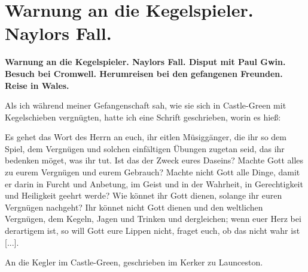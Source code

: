 
\chapter[Warnung an die Kegelspieler. Naylors Fall.]{Warnung an die Kegelspieler. Naylors Fall.}

\begin{center}
\textbf{Warnung an die Kegelspieler. Naylors Fall. Disput mit Paul
Gwin. Besuch bei Cromwell. Herumreisen bei den gefangenen
Freunden. Reise in Wales.}
\end{center}


Als ich während meiner Gefangenschaft sah, wie sie sich in
Castle-Green mit Kegelschieben 
vergnügten, hatte ich eine Schrift geschrieben, worin es hieß:

{
Es gehet das Wort des Herrn an euch, ihr eitlen Müsiggänger, 
die ihr so dem Spiel, dem Vergnügen und solchen 
einfältigen Übungen zugetan seid, das ihr bedenken möget, was ihr
tut. Ist das der Zweck eures Daseins? Machte Gott alles zu
eurem Vergnügen und eurem Gebrauch? Machte nicht Gott alle
Dinge, damit er darin in Furcht und Anbetung, im Geist und in
der Wahrheit, in Gerechtigkeit und Heiligkeit geehrt werde? Wie
könnet ihr Gott dienen, solange ihr euren 
Vergnügen nachgeht?
Ihr könnet nicht Gott dienen und den weltlichen Vergnügen, dem
Kegeln, Jagen und Trinken und dergleichen; wenn euer Herz bei
derartigem ist, so will Gott eure Lippen nicht, fraget euch, ob das
nicht wahr ist [...]. 

\bigskip
An die Kegler im Castle-Green, geschrieben 
im Kerker zu Launceston.
}


